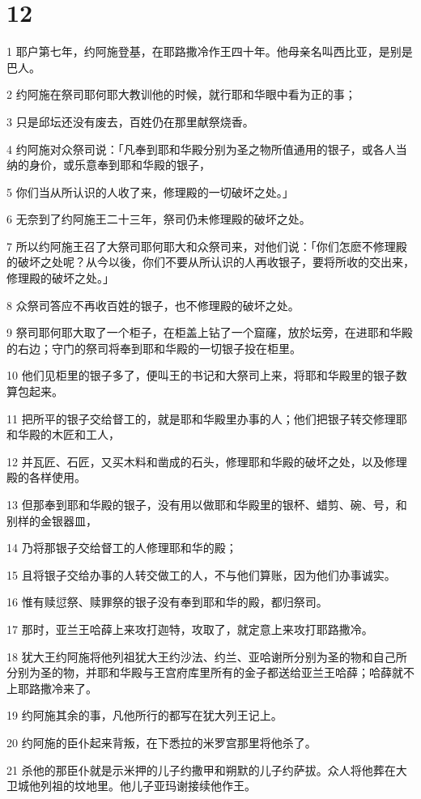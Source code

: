 \chapter{12}

\par 1 耶户第七年，约阿施登基，在耶路撒冷作王四十年。他母亲名叫西比亚，是别是巴人。
\par 2 约阿施在祭司耶何耶大教训他的时候，就行耶和华眼中看为正的事；
\par 3 只是邱坛还没有废去，百姓仍在那里献祭烧香。
\par 4 约阿施对众祭司说：「凡奉到耶和华殿分别为圣之物所值通用的银子，或各人当纳的身价，或乐意奉到耶和华殿的银子，
\par 5 你们当从所认识的人收了来，修理殿的一切破坏之处。」
\par 6 无奈到了约阿施王二十三年，祭司仍未修理殿的破坏之处。
\par 7 所以约阿施王召了大祭司耶何耶大和众祭司来，对他们说：「你们怎麽不修理殿的破坏之处呢？从今以後，你们不要从所认识的人再收银子，要将所收的交出来，修理殿的破坏之处。」
\par 8 众祭司答应不再收百姓的银子，也不修理殿的破坏之处。
\par 9 祭司耶何耶大取了一个柜子，在柜盖上钻了一个窟窿，放於坛旁，在进耶和华殿的右边；守门的祭司将奉到耶和华殿的一切银子投在柜里。
\par 10 他们见柜里的银子多了，便叫王的书记和大祭司上来，将耶和华殿里的银子数算包起来。
\par 11 把所平的银子交给督工的，就是耶和华殿里办事的人；他们把银子转交修理耶和华殿的木匠和工人，
\par 12 并瓦匠、石匠，又买木料和凿成的石头，修理耶和华殿的破坏之处，以及修理殿的各样使用。
\par 13 但那奉到耶和华殿的银子，没有用以做耶和华殿里的银杯、蜡剪、碗、号，和别样的金银器皿，
\par 14 乃将那银子交给督工的人修理耶和华的殿；
\par 15 且将银子交给办事的人转交做工的人，不与他们算账，因为他们办事诚实。
\par 16 惟有赎愆祭、赎罪祭的银子没有奉到耶和华的殿，都归祭司。
\par 17 那时，亚兰王哈薛上来攻打迦特，攻取了，就定意上来攻打耶路撒冷。
\par 18 犹大王约阿施将他列祖犹大王约沙法、约兰、亚哈谢所分别为圣的物和自己所分别为圣的物，并耶和华殿与王宫府库里所有的金子都送给亚兰王哈薛；哈薛就不上耶路撒冷来了。
\par 19 约阿施其余的事，凡他所行的都写在犹大列王记上。
\par 20 约阿施的臣仆起来背叛，在下悉拉的米罗宫那里将他杀了。
\par 21 杀他的那臣仆就是示米押的儿子约撒甲和朔默的儿子约萨拔。众人将他葬在大卫城他列祖的坟地里。他儿子亚玛谢接续他作王。

